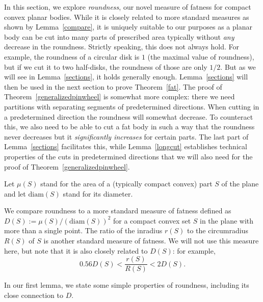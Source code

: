 \documentclass[12pt]{article}
\theoremstyle{plain}
\theoremstyle{definition}
\theoremstyle{remark}
\def\diam{\mathrm{diam}}
\begin{document}
In this section, we explore \emph{roundness}, our novel measure of fatness for compact convex planar bodies. While it is closely related to more standard measures as shown by Lemma~\ref{compare}, it is uniquely suitable to our purposes as a planar body can be cut into many parts of prescribed area typically without \emph{any} decrease in the roundness. Strictly speaking, this does not always hold. For example, the roundness of a circular disk is $1$ (the maximal value of roundness), but if we cut it to two half-disks, the roundness of those are only $1/2$. But as we will see in Lemma~\ref{sections}, it holds generally enough. Lemma~\ref{sections} will then be used in the next section to prove Theorem~\ref{fat}. The proof of Theorem~\ref{generalizedpinwheel} is somewhat more complex: there we need partitions with separating segments of predetermined directions. When cutting in a predetermined direction the roundness will somewhat decrease. To counteract this, we also need to be able to cut a fat body in such a way that the roundness never decreases but it \emph{significantly increases} for certain parts. The last part of Lemma~\ref{sections} facilitates this, while Lemma~\ref{longcut} establishes technical properties of the cuts in predetermined directions that we will also need for the proof of Theorem~\ref{generalizedpinwheel}.

Let $\mu(S)$ stand for the area of a (typically compact convex) part $S$ of the plane and let $\diam(S)$ stand for its diameter.%


We compare roundness to a more standard measure of fatness defined as $D(S):=\mu(S)/(\diam(S))^2$ for a compact convex set $S$ in the plane with more than a single point. The ratio of the inradius $r(S)$ to the circumradius $R(S)$ of $S$ is another standard measure of fatness. We will not use this measure here, but note that it is also closely related to $D(S)$: for example,
$$0.56D(S)<\frac{r(S)}{R(S)}<2D(S).$$

In our first lemma, we state some simple properties of roundness, including its close connection to $D$.
\end{document}
